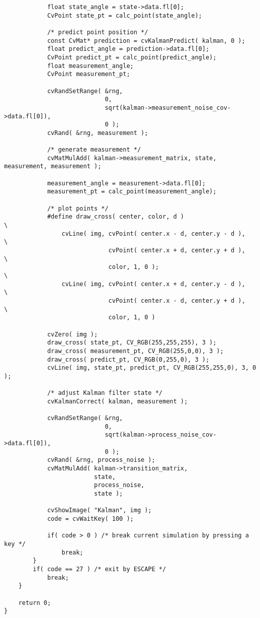 \begin{lstlisting}
            float state_angle = state->data.fl[0];
            CvPoint state_pt = calc_point(state_angle);

            /* predict point position */
            const CvMat* prediction = cvKalmanPredict( kalman, 0 );
            float predict_angle = prediction->data.fl[0];
            CvPoint predict_pt = calc_point(predict_angle);
            float measurement_angle;
            CvPoint measurement_pt;

            cvRandSetRange( &rng,
                            0,
                            sqrt(kalman->measurement_noise_cov->data.fl[0]),
                            0 );
            cvRand( &rng, measurement );

            /* generate measurement */
            cvMatMulAdd( kalman->measurement_matrix, state, measurement, measurement );

            measurement_angle = measurement->data.fl[0];
            measurement_pt = calc_point(measurement_angle);

            /* plot points */
            #define draw_cross( center, color, d )                        \
                cvLine( img, cvPoint( center.x - d, center.y - d ),       \
                             cvPoint( center.x + d, center.y + d ),       \
                             color, 1, 0 );                               \
                cvLine( img, cvPoint( center.x + d, center.y - d ),       \
                             cvPoint( center.x - d, center.y + d ),       \
                             color, 1, 0 )

            cvZero( img );
            draw_cross( state_pt, CV_RGB(255,255,255), 3 );
            draw_cross( measurement_pt, CV_RGB(255,0,0), 3 );
            draw_cross( predict_pt, CV_RGB(0,255,0), 3 );
            cvLine( img, state_pt, predict_pt, CV_RGB(255,255,0), 3, 0 );

            /* adjust Kalman filter state */
            cvKalmanCorrect( kalman, measurement );

            cvRandSetRange( &rng,
                            0,
                            sqrt(kalman->process_noise_cov->data.fl[0]),
                            0 );
            cvRand( &rng, process_noise );
            cvMatMulAdd( kalman->transition_matrix,
                         state,
                         process_noise,
                         state );

            cvShowImage( "Kalman", img );
            code = cvWaitKey( 100 );

            if( code > 0 ) /* break current simulation by pressing a key */
                break;
        }
        if( code == 27 ) /* exit by ESCAPE */
            break;
    }

    return 0;
}
\end{lstlisting}
\fi

